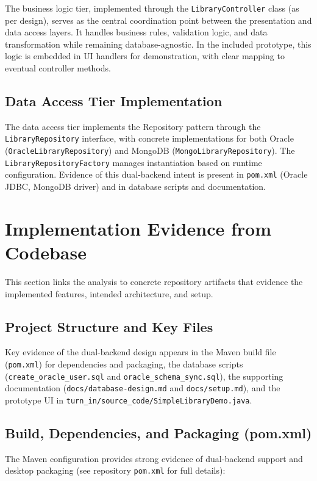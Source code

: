 \documentclass[12pt,a4paper]{article}
\newcommand{\file}[1]{\texttt{#1}}
\newcommand{\class}[1]{\texttt{#1}}
\begin{document}
The business logic tier, implemented through the \class{LibraryController} class (as per design), serves as the central coordination point between the presentation and data access layers. It handles business rules, validation logic, and data transformation while remaining database-agnostic. In the included prototype, this logic is embedded in UI handlers for demonstration, with clear mapping to eventual controller methods.

\subsection{Data Access Tier Implementation}

The data access tier implements the Repository pattern through the \class{LibraryRepository} interface, with concrete implementations for both Oracle (\class{OracleLibraryRepository}) and MongoDB (\class{MongoLibraryRepository}). The \class{LibraryRepositoryFactory} manages instantiation based on runtime configuration. Evidence of this dual-backend intent is present in \file{pom.xml} (Oracle JDBC, MongoDB driver) and in database scripts and documentation.

\section{Implementation Evidence from Codebase}

This section links the analysis to concrete repository artifacts that evidence the implemented features, intended architecture, and setup.

\subsection{Project Structure and Key Files}

Key evidence of the dual-backend design appears in the Maven build file (\file{pom.xml}) for dependencies and packaging, the database scripts (\file{create\_oracle\_user.sql} and \file{oracle\_schema\_sync.sql}), the supporting documentation (\file{docs/database-design.md} and \file{docs/setup.md}), and the prototype UI in \file{turn\_in/source\_code/SimpleLibraryDemo.java}.

\subsection{Build, Dependencies, and Packaging (pom.xml)}

The Maven configuration provides strong evidence of dual-backend support and desktop packaging (see repository \file{pom.xml} for full details):
\end{document}
